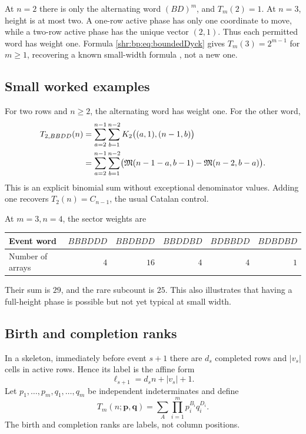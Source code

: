 \documentclass[11pt,letterpaper]{article}
\numberwithin{equation}{section}
\theoremstyle{definition}
\newcommand{\1}{\mathbf 1}
\newcommand{\M}{\mathfrak M}
\begin{document}
At $n=2$ there is only the alternating word $(BD)^m$, and $T_m(2)=1$.
At $n=3$, height is at most two. A one-row active phase has only one
coordinate to move, while a two-row active phase has the unique vector
$(2,1)$. Thus each permitted word has weight one. Formula
\eqref{shr:bp:eq:boundedDyck} gives $T_m(3)=2^{m-1}$ for $m\ge1$, recovering a
known small-width formula \cite{Sun}, not a new one.

\subsection{Small worked examples}
For two rows and $n\ge2$, the alternating word has weight one. For the
other word,
\begin{align}
 T_{2,BBDD}(n)
 &=\sum_{a=2}^{n-1}\sum_{b=1}^{n-2}
 K_2\bigl((a,1),(n-1,b)\bigr)\notag\\
 &=\sum_{a=2}^{n-1}\sum_{b=1}^{n-2}
 \bigl(\M(n-1-a,b-1)-\M(n-2,b-a)\bigr).
 \label{shr:bp:eq:two-row}
\end{align}
This is an explicit binomial sum without exceptional denominator values.
Adding one recovers $T_2(n)=C_{n-1}$, the usual Catalan control.

At $m=3,n=4$, the sector weights are
\begin{center}
\begin{tabular}{@{}lrrrrr@{}}
\toprule
Event word & $BBBDDD$ & $BBDBDD$ & $BBDDBD$ & $BDBBDD$ & $BDBDBD$\\
\midrule
Number of arrays & $4$ & $16$ & $4$ & $4$ & $1$\\
\bottomrule
\end{tabular}
\end{center}
Their sum is $29$, and the rare subcount is $25$. This also illustrates
that having a full-height phase is possible but not yet typical at small
width.

\subsection{Birth and completion ranks}
In a skeleton, immediately before event $s+1$ there are $d_s$ completed
rows and $|v_s|$ cells in active rows. Hence its label is the affine form
\begin{equation}
 \ell_{s+1}=d_s n+|v_s|+1.
 \label{shr:bp:eq:rank}
\end{equation}
Let $p_1,\ldots,p_m,q_1,\ldots,q_m$ be independent indeterminates and define
\begin{equation}
 T_m(n;\mathbf p,\mathbf q)
 =\sum_A\prod_{i=1}^m p_i^{B_i}q_i^{D_i}.
 \label{shr:bp:eq:marks}
\end{equation}
The birth and completion ranks are labels, not column positions.
\end{document}
